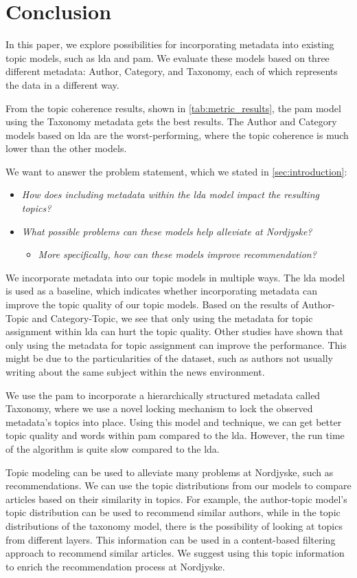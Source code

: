 \section{Conclusion}\label{sec:conclusion}
In this paper, we explore possibilities for incorporating metadata into existing topic models, such as \gls{lda} and \gls{pam}.
We evaluate these models based on three different metadata: Author, Category, and Taxonomy, each of which represents the data in a different way.

From the topic coherence results, shown in \autoref{tab:metric_results}, the \gls{pam} model using the Taxonomy metadata gets the best results.
The Author and Category models based on \gls{lda} are the worst-performing, where the topic coherence is much lower than the other models.

We want to answer the problem statement, which we stated in \autoref{sec:introduction}:


\begin{itemize}
	\item \textit{How does including metadata within the \gls{lda} model impact the resulting topics?}
	\item \textit{What possible problems can these models help alleviate at Nordjyske?}
	\begin{itemize}
		\item \textit{More specifically, how can these models improve recommendation?}
	\end{itemize}
\end{itemize}

We incorporate metadata into our topic models in multiple ways.
The \gls{lda} model is used as a baseline, which indicates whether incorporating metadata can improve the topic quality of our topic models.
Based on the results of Author-Topic and Category-Topic, we see that only using the metadata for topic assignment within \gls{lda} can hurt the topic quality.
Other studies have shown that only using the metadata for topic assignment can improve the performance.
This might be due to the particularities of the dataset, such as authors not usually writing about the same subject within the news environment.  


We use the \gls{pam} to incorporate a hierarchically structured metadata called Taxonomy, where we use a novel locking mechanism to lock the observed metadata's topics into place.
Using this model and technique, we can get better topic quality and words within \gls{pam} compared to the \gls{lda}.
However, the run time of the algorithm is quite slow compared to the \gls{lda}.


Topic modeling can be used to alleviate many problems at Nordjyske, such as recommendations.
We can use the topic distributions from our models to compare articles based on their similarity in topics.
For example, the author-topic model's topic distribution can be used to recommend similar authors, while in the topic distributions of the taxonomy model, there is the possibility of looking at topics from different layers.
This information can be used in a content-based filtering approach to recommend similar articles.
We suggest using this topic information to enrich the recommendation process at Nordjyske. 
